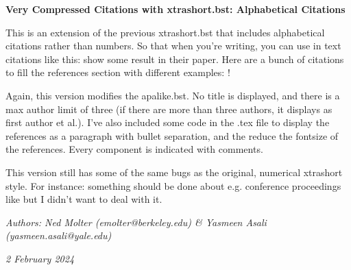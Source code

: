 \documentclass[11pt]{article}
\begin{document}
\begin{center}
	\textbf{Very Compressed Citations with xtrashort.bst: Alphabetical Citations}
\end{center}

\justification


This is an extension of the previous xtrashort.bst that includes alphabetical citations rather than numbers. So that when you're writing, you can use in text citations like this: \cite{akins23} show some result in their paper. Here are a bunch of citations to fill the references section with different examples: \citep{akins23, allison91, arras21, atreya20, aurnou07, beebe05, brogan18, lellouch07, sherjal95,  esposito91, teca}!

Again, this version modifies the apalike.bst. No title is displayed, and there is a max author limit of three (if there are more than three authors, it displays as first author et al.). I've also included some code in the .tex file to display the references as a paragraph with bullet separation, and the reduce the fontsize of the references. Every component is indicated with comments. 

This version still has some of the same bugs as the original, numerical xtrashort style. For instance: something should be done about e.g. conference proceedings like \citep{thatte15} but I didn't want to deal with it.



\vspace{2cm}
\noindent\textit{Authors: Ned Molter (emolter@berkeley.edu) \& Yasmeen Asali (yasmeen.asali@yale.edu)}

\noindent\textit{2 February 2024}
\end{document}
